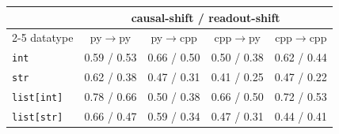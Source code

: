 \begin{tabular}{lcccc}
\toprule
& \multicolumn{4}{c}{causal-shift / readout-shift} \\
\cmidrule(lr){2-5}
datatype & py$\to$py & py$\to$cpp & cpp$\to$py & cpp$\to$cpp \\
\midrule
\texttt{int} & 0.59 / 0.53 & 0.66 / 0.50 & 0.50 / 0.38 & 0.62 / 0.44 \\
\texttt{str} & 0.62 / 0.38 & 0.47 / 0.31 & 0.41 / 0.25 & 0.47 / 0.22 \\
\texttt{list[int]} & 0.78 / 0.66 & 0.50 / 0.38 & 0.66 / 0.50 & 0.72 / 0.53 \\
\texttt{list[str]} & 0.66 / 0.47 & 0.59 / 0.34 & 0.47 / 0.31 & 0.44 / 0.41 \\
\bottomrule
\end{tabular}
